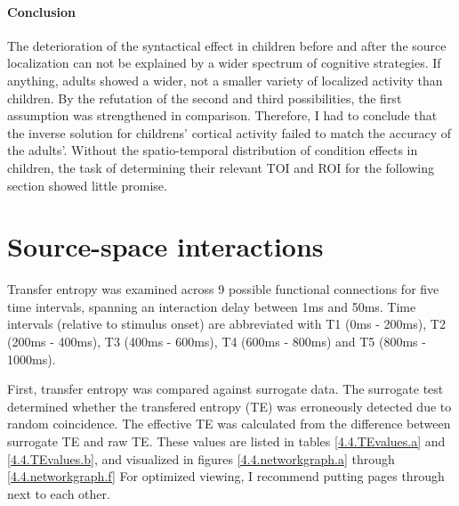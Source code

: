 \paragraph{Conclusion}
The deterioration of the syntactical effect in children before and after the source localization can not be explained by a wider spectrum of cognitive strategies.
If anything, adults showed a wider, not a smaller variety of localized activity than children.
By the refutation of the second and third possibilities, the first assumption was strengthened in comparison.
Therefore, I had to conclude that the inverse solution for childrens' cortical activity failed to match the accuracy of the adults'.
Without the spatio-temporal distribution of condition effects in children, the task of determining their relevant TOI and ROI for the following section showed little promise.\section{Source-space interactions}

Transfer entropy was examined across 9 possible functional connections for five time intervals, spanning an interaction delay between 1ms and 50ms.
Time intervals (relative to stimulus onset) are abbreviated with T1 (0ms - 200ms), T2 (200ms - 400ms), T3 (400ms - 600ms), T4 (600ms - 800ms) and T5 (800ms - 1000ms).

First, transfer entropy was compared against surrogate data.
The surrogate test determined whether the transfered entropy (TE) was erroneously detected due to random coincidence.
The effective TE was calculated from the difference between surrogate TE and raw TE.
These values are listed in tables \ref{4.4.TEvalues.a} and \ref{4.4.TEvalues.b}, and visualized in figures \ref{4.4.networkgraph.a} through \ref{4.4.networkgraph.f} For optimized viewing, I recommend putting pages \pageref{4.4.networkgraph.a} through \pageref{4.4.networkgraph.e} next to each other.

